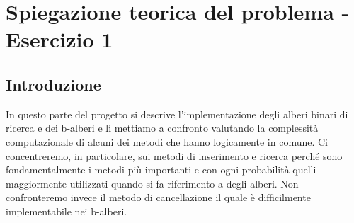 \section{Spiegazione teorica del problema - Esercizio 1}

\subsection{Introduzione}
\label{sec:Introduzione_1}
In questo parte del progetto si descrive l'implementazione degli alberi binari di ricerca e dei b-alberi e li mettiamo a confronto valutando la complessità computazionale di alcuni dei metodi che hanno logicamente in comune. Ci concentreremo, in particolare, sui metodi di inserimento e ricerca perché sono fondamentalmente i metodi più importanti e con ogni probabilità quelli maggiormente utilizzati quando si fa riferimento a degli alberi. Non confronteremo invece il metodo di cancellazione il quale è difficilmente implementabile nei b-alberi.

